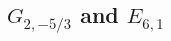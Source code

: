 \documentclass[a4paper,12pt]{article}
\begin{document}




\subsection{\ensuremath{G_{2,-5/3}} and \ensuremath{E_{6,1}}}
\end{document}
